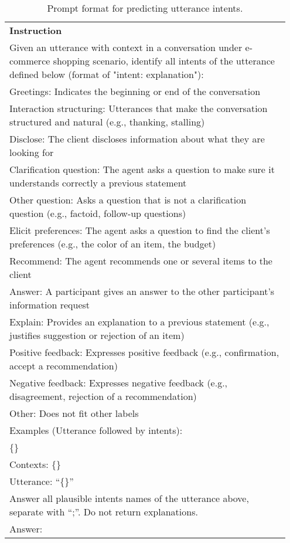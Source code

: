 \begin{table*}[t]
\small
\begin{center}
    \begin{tabular}{p{0.95\linewidth} }
    \hline
    \textbf{Instruction} \\ 
    Given an utterance with context in a conversation under e-commerce shopping scenario, 
identify all intents of the utterance defined below (format of "intent: explanation"): \\ \hdashline

Greetings: Indicates the beginning or end of the conversation \\
Interaction structuring: Utterances that make the conversation structured and natural (e.g., thanking, stalling)\\
Disclose: The client discloses information about what they are looking for\\
Clarification question: The agent asks a question to make sure it understands correctly a previous statement\\
Other question: Asks a question that is not a clarification question (e.g., factoid, follow-up questions)\\
Elicit preferences: The agent asks a question to find the client’s preferences (e.g., the color of an item, the budget)\\
Recommend: The agent recommends one or several items to the client\\
Answer: A participant gives an answer to the other participant’s information request\\
Explain: Provides an explanation to a previous statement (e.g., justifies suggestion or rejection of an item)\\
Positive feedback: Expresses positive feedback (e.g., confirmation, accept a recommendation)\\
Negative feedback: Expresses negative feedback (e.g., disagreement, rejection of a recommendation)\\
Other: Does not fit other labels\\ \hdashline

Examples (Utterance followed by intents): \\
\{\} \\

Contexts: \{\} \\

Utterance: ``\{\}'' \\
Answer all plausible intents names of the utterance above, separate with ``;''. Do not return explanations.\\
Answer: \\ \hline
    \end{tabular}
    \caption{Prompt format for predicting utterance intents. } \label{tab:intent_prompt}
\end{center}
\end{table*}

